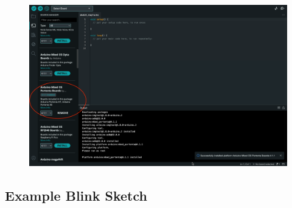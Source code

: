 	\begin{figure}
		\begin{center}
			
			\includegraphics[width=0.7\linewidth]{images/ArduinoIDE/ArduinoMbedOSPortentaBoardsInstallation.png}
			\label{Installation Arduino Mbed OS Portenta Board}
		\end{center}
	\end{figure}

\subsection{Example Blink Sketch}

